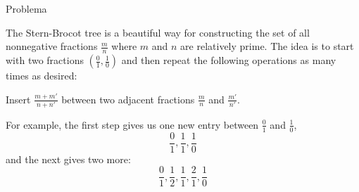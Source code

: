 
\begin{frame}[fragile]{Problema}

The Stern-Brocot tree is a beautiful way for constructing the set of all nonnegative fractions 
$\frac{m}{n}$ where $m$ and $n$ are relatively prime. The idea is to start with two fractions 
$(\frac{0}{1}, \frac{1}{0})$ and then repeat the following operations as many times as desired:

\begin{center}
Insert $\frac{m+m'}{n+n'}$ between two adjacent fractions $\frac{m}{n}$ and $\frac{m'}{n'}$. 
\end{center}

For example, the first step gives us one new entry between $\frac{0}{1}$ and $\frac{1}{0}$,
\[
    \frac{0}{1}, \frac{1}{1}, \frac{1}{0}
\]
and the next gives two more:
\[
    \frac{0}{1}, \frac{1}{2}, \frac{1}{1}, \frac{2}{1},\frac{1}{0}
\]

\end{frame}

